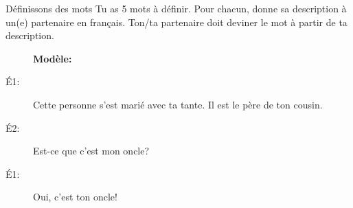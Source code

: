 \begin{frame}{Définissons des mots}
  Tu as 5 mots à définir.
  Pour chacun, donne sa description à un(e) partenaire \alert{en français}.
  Ton/ta partenaire doit deviner le mot à partir de ta description.
  \begin{description}
    \item[] \textbf{Modèle:} 
    \item[É1:] Cette personne s'est marié avec ta tante. Il est le père de ton cousin.
    \item[É2:] Est-ce que c'est mon oncle?
    \item[É1:] Oui, c'est ton oncle!
  \end{description}
\end{frame}